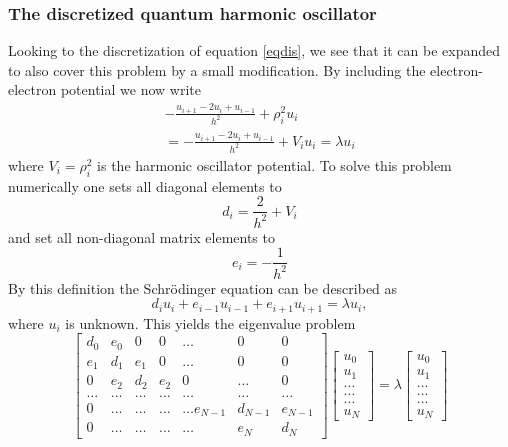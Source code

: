 \documentclass[%
reprint,
amsmath,amssymb,
aps,
]{revtex4-1}
\begin{document}
\subsubsection{The discretized quantum harmonic oscillator}
Looking to the discretization of equation \ref{eqdis}, we see that it can be expanded to also cover this problem by a small modification. By including the electron-electron potential we now write 
\begin{equation}\label{eqho2}
\begin{aligned}
	-\frac{u_{i+1} -2u_i +u_{i-1}}{h^2}+\rho_i^2u_i \\=-\frac{u_{i+1} -2u_i +u_{i-1} }{h^2}+V_iu_i  = \lambda u_i
\end{aligned}
\end{equation}
where $V_i=\rho_i^2$ is the harmonic oscillator potential. To solve this problem numerically one sets all diagonal elements to 
\begin{equation}\label{hoeq3}
d_i=\frac{2}{h^2}+V_i
\end{equation}
and set all non-diagonal matrix elements to
\begin{equation}\label{hoeq4}
e_i=-\frac{1}{h^2}
\end{equation}
By this definition the Schrödinger equation can be described as
\begin{equation*}
d_iu_i+e_{i-1}u_{i-1}+e_{i+1}u_{i+1}  = \lambda u_i,
\end{equation*}
where $u_i$ is unknown. This yields the eigenvalue problem
\begin{equation}\label{evho}
\begin{bmatrix}d_0 & e_0 & 0   & 0    & \dots  &0     & 0 \\
e_1 & d_1 & e_1 & 0    & \dots  &0     &0 \\
0   & e_2 & d_2 & e_2  &0       &\dots & 0\\
\dots  & \dots & \dots & \dots  &\dots      &\dots & \dots\\
0   & \dots & \dots & \dots  &\dots  e_{N-1}     &d_{N-1} & e_{N-1}\\
0   & \dots & \dots & \dots  &\dots       &e_{N} & d_{N}
\end{bmatrix}  \begin{bmatrix} u_{0} \\
u_{1} \\
\dots\\ \dots\\ \dots\\
u_{N}
\end{bmatrix}=\lambda \begin{bmatrix} u_{0} \\
u_{1} \\
\dots\\ \dots\\ \dots\\
u_{N}
\end{bmatrix}
\end{equation}
\end{document}
